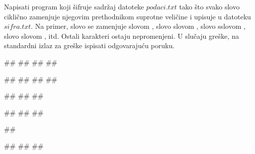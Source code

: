 \begin{Exercise}[label=p3_id17]         
Napisati program koji šifruje sadržaj datoteke $podaci.txt$ tako što svako slovo ciklično 
zamenjuje njegovim prethodnikom suprotne veličine i upisuje u datoteku $sifra.txt$. 
Na primer, slovo  se zamenjuje slovom , slovo 
 slovom , slovo  sslovom , slovo  slovom 
, itd. Ostali karakteri ostaju nepromenjeni. 
U slučaju greške, na standardni izlaz za greške ispisati odgovarajuću poruku.

\begin{minitest}
\begin{upotreba}{1}
##
##
##
##

##
##
##
##
\end{upotreba}
\end{minitest}
\begin{minitest}
\begin{upotreba}{2}
##
##
##

##
##
##
\end{upotreba}
\end{minitest}
\begin{minitest}
\begin{upotreba}{3}
##

#\naslovIzlazZaGresku#
##
##
\end{upotreba}
\end{minitest}
\end{Exercise}
\begin{Answer}[ref=p3_id17]
\end{Answer}


